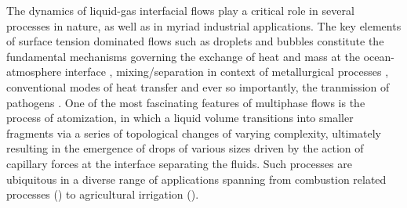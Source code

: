 The dynamics of liquid-gas interfacial flows play a critical role in several processes in nature, 
as well as in myriad industrial applications. 
The key elements of surface tension dominated flows such as droplets and bubbles constitute the  
fundamental mechanisms governing the exchange of heat and mass at the ocean-atmosphere interface \cite{seinfeld1998air,deike}, 
mixing/separation in context of metallurgical processes \cite{johansen1988fluid,metal},  
conventional modes of heat transfer \cite{deckwer1980mechanism,bubble}
and ever so importantly, the tranmission of pathogens \cite{lydia_1,lydia_2}. 
One of the most fascinating features of multiphase flows is the process of atomization, 
in which a liquid volume transitions into smaller fragments via a series of topological 
changes of varying complexity, ultimately resulting in the emergence of drops of various sizes
driven by the action of capillary forces at the interface separating the fluids.  
Such processes are ubiquitous in a diverse range of applications spanning from combustion related processes 
(\cite{lefebvre2017atomization,bayvel1993liquid}) to agricultural irrigation (\cite{lake1977effect,reichenberger2007mitigation}).    

